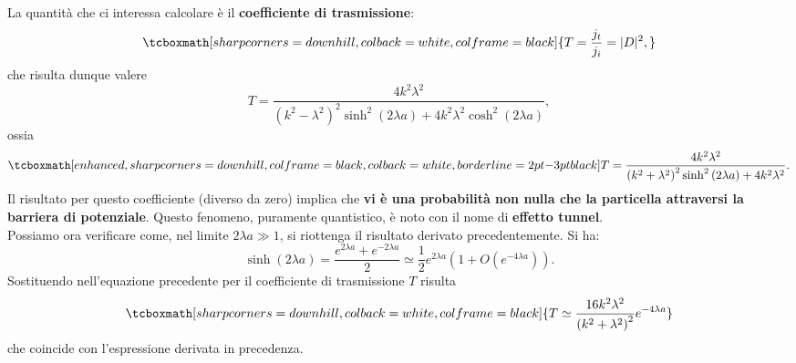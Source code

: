 \documentclass[a4paper,12pt,oneside]{book}
\begin{document}
La quantità che ci interessa calcolare è il \textbf{coefficiente di trasmissione}:
	\begin{equation}
		\tcboxmath[sharp corners=downhill, colback=white, colframe=black]{
			T=\frac{j_t}{j_i} =|D|^2,
			}
	\end{equation}
che risulta dunque valere
	\begin{equation}
		T=\frac{4k^2 \lambda ^2}{\left(k^2-\lambda^2\right) ^2\sinh ^2\left(2\lambda a\right)+4k^2\lambda ^2\cosh ^2\left(2\lambda a\right)},
	\end{equation}
ossia
	\begin{equation}
		\tcboxmath[enhanced, sharp corners=downhill, colframe=black, colback=white, borderline={2pt}{-3pt}{black}]{
			T=\frac{4k^2 \lambda ^2}{\left(k^2+\lambda^2\right) ^2\sinh ^2\left(2\lambda a\right)+4k^2\lambda ^2}.
			}
	\end{equation}
Il risultato per questo coefficiente (diverso da zero) implica che \textbf{vi è una probabilità non nulla che la particella attraversi la barriera di potenziale}. Questo fenomeno, puramente quantistico, è noto con il nome di \textbf{effetto tunnel}.\\

Possiamo ora verificare come, nel limite $2\lambda a \gg 1$, si riottenga il risultato derivato precedentemente. Si ha:
	\begin{equation}
		\sinh \left( 2 \lambda a \right) = \frac{e^{2\lambda a }+ e ^{-2\lambda a }}{2} \simeq \frac{1}{2} e^{2\lambda a} \left( 1+ O(e^{-4\lambda a}) \right).
\end{equation}
Sostituendo nell'equazione precedente per il coefficiente di trasmissione $T$ risulta
	\begin{equation}
		\tcboxmath[sharp corners=downhill, colback=white, colframe=black]{
		T \simeq \frac{16k^2 \lambda ^2}{\left( k^2+\lambda ^2\right) ^2}e^{-4\lambda a }}
	\end{equation}
che coincide con l'espressione derivata in precedenza.
\end{document}
